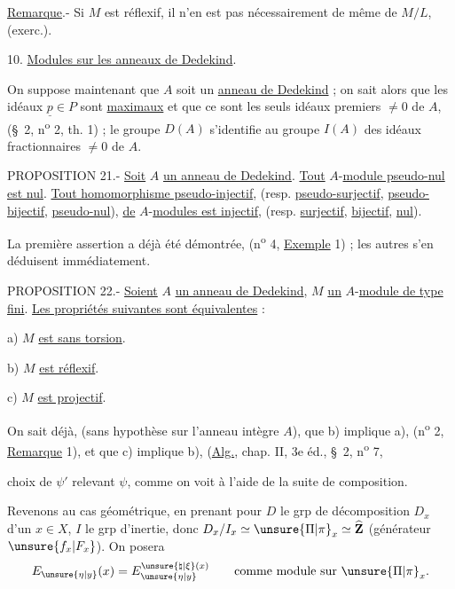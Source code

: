 \uline{Remarque}.- Si $M$ est réflexif, il n'en est pas nécessairement de même de $M/L$, (exerc.\quad).

10. \uline{Modules sur les anneaux de Dedekind}.

On suppose maintenant que $A$ soit un \uline{anneau de Dedekind} ; on sait alors que les idéaux $\underline{p}\in P$ sont \uline{maximaux} et que ce sont les seuls idéaux premiers $\ne 0$ de $A$, (\S\ 2, n\textsuperscript{o} 2, th. 1) ; le groupe $D(A)$ s'identifie au groupe $I(A)$ des idéaux fractionnaires $\ne 0$ de $A$.

PROPOSITION 21.- \uline{Soit} $A$ \uline{un anneau de Dedekind}. \uline{Tout} $A$-\uline{module pseudo-nul est nul}. \uline{Tout homomorphisme pseudo-injectif}, (resp. \uline{pseudo-surjectif}, \uline{pseudo-bijectif}, \uline{pseudo-nul}), \uline{de} $A$-\uline{modules est injectif}, (resp. \uline{surjectif}, \uline{bijectif}, \uline{nul}).

La première assertion a déjà été démontrée, (n\textsuperscript{o} 4, \uline{Exemple} 1) ; les autres s'en déduisent immédiatement.

PROPOSITION 22.- \uline{Soient} $A$ \uline{un anneau de Dedekind}, $M$ \uline{un} $A$-\uline{module de type fini}. \uline{Les propriétés suivantes sont équivalentes} :

a) $M$ \uline{est sans torsion}.

b) $M$ \uline{est réflexif}.

c) $M$ \uline{est projectif}.

On sait déjà, (sans hypothèse sur l'anneau intègre $A$), que b) implique a), (n\textsuperscript{o} 2, \uline{Remarque} 1), et que c) implique b), (\uline{Alg.}, chap. II, 3e éd., \S\ 2, n\textsuperscript{o} 7,


choix de $\psi'$ relevant $\psi$, comme on voit à l'aide de la suite de composition.


Revenons au cas géométrique, en prenant pour $D$ le grp de décomposition $D_x$ d'un $x\in X$, $I$ le grp d'inertie, donc $D_x/I_x\simeq\unsure{\Pi|\pi}_x\simeq\widehat{\mathbf{Z}}$ (générateur $\unsure{f_x|F_x}$). On posera
\[
E_{\unsure{\eta|y}}(x)=E_{\unsure{\eta|y}}^{\unsure{\natural|\xi}(x)}\qquad\text{comme module sur }\unsure{\Pi|\pi}_x.
\]

